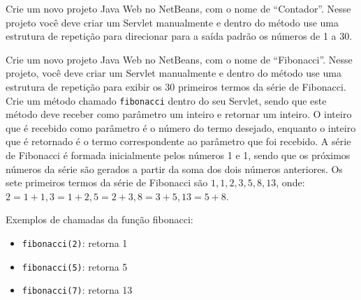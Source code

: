 \begin{projetoSemArquivo}{}{}{}
    Crie um novo projeto Java Web no NetBeans, com o nome de ``Contador''. Nesse projeto você deve criar um Servlet manualmente e dentro do método  use uma estrutura de repetição para direcionar para a saída padrão os números de 1 a 30.
\end{projetoSemArquivo}

\begin{projetoSemArquivo}{}{}{}
    Crie um novo projeto Java Web no NetBeans, com o nome de ``Fibonacci''. Nesse projeto, você deve criar um Servlet manualmente e dentro do método  use uma estrutura de repetição para exibir os 30 primeiros termos da série de Fibonacci. Crie um método chamado \texttt{fibonacci} dentro do seu Servlet, sendo que este método deve receber como parâmetro um inteiro e retornar um inteiro. O inteiro que é recebido como parâmetro é o número do termo desejado, enquanto o inteiro que é retornado é o termo correspondente ao parâmetro que foi recebido. A série de Fibonacci é formada inicialmente pelos números 1 e 1, sendo que os próximos números da série são gerados a partir da soma dos dois números anteriores. Os sete primeiros termos da série de Fibonacci são $1, 1, 2, 3, 5, 8, 13$, onde: $2 = 1 + 1, 3 = 1 + 2, 5 = 2 + 3, 8 = 3 + 5, 13 = 5 + 8$.
    
    Exemplos de chamadas da função fibonacci:
    \begin{itemize}
        \item \texttt{fibonacci(2)}: retorna 1
        \item \texttt{fibonacci(5)}: retorna 5
        \item \texttt{fibonacci(7)}: retorna 13
    \end{itemize}
    
\end{projetoSemArquivo}